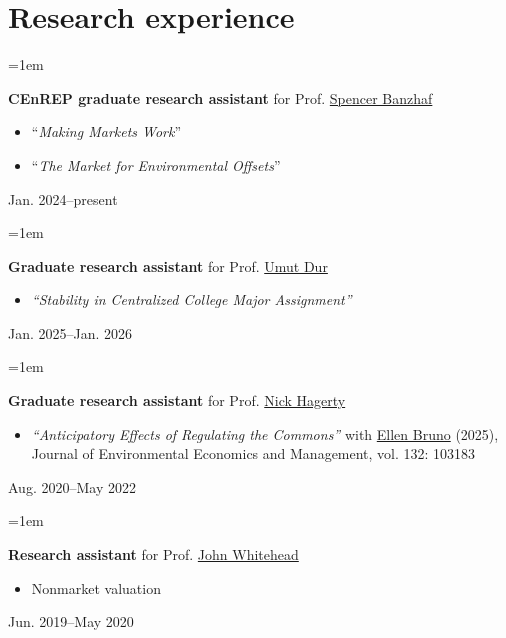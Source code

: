 \documentclass[12pt]{article}
\newenvironment{highlightsforbulletentries}{
	\begin{itemize}[
		topsep=0.10 cm,
		partopsep=0pt,
		leftmargin=20pt,
		]
	\setlength{\parsep}{0.10cm}\setlength{\itemsep}{-2pt}
	}{
	\end{itemize}
}
\newenvironment{twocolentry}[2][]{%
	\par\noindent\def\secondColumn{#2}%
	\begin{minipage}[t]{\linewidth-5.1cm}\raggedright\hangindent=1em\hangafter=1\relax%
	}
	{%
		\end{minipage}\hfill%
		\begin{minipage}[t]{5cm}\raggedleft\secondColumn\end{minipage}\par\smallskip
	}
\begin{document}
\section{Research experience}

\begin{twocolentry}
	{Jan. 2024--present}
	\textbf{CEnREP graduate research assistant} for Prof. \href{https://spencerbanzhaf.wordpress.ncsu.edu/}{Spencer Banzhaf}
	\begin{highlightsforbulletentries}
		\item ``\emph{Making Markets Work}''
		\item ``\emph{The Market for Environmental Offsets}''
	\end{highlightsforbulletentries}
\end{twocolentry}


\begin{twocolentry}
	{Jan. 2025--Jan. 2026}
	\textbf{Graduate research assistant} for Prof. \href{https://sites.google.com/site/umutdur/home}{Umut Dur}
	\begin{highlightsforbulletentries}
		\item \emph{``Stability in Centralized College Major Assignment''}
	\end{highlightsforbulletentries}
\end{twocolentry}

\begin{twocolentry}
	{Aug. 2020--May 2022}
	\textbf{Graduate research assistant} for Prof. \href{https://www.nickhagerty.com/}{Nick Hagerty}
	\begin{highlightsforbulletentries}
		\item \emph{``Anticipatory Effects of Regulating the Commons''} with \href{https://ellen-bruno.com/}{Ellen Bruno} (2025), Journal of Environmental Economics and Management, vol. 132: 103183
	\end{highlightsforbulletentries}
\end{twocolentry}

\begin{twocolentry}
	{Jun. 2019--May 2020}
	\textbf{Research assistant} for Prof. \href{https://economics.appstate.edu/directory/john-whitehead-phd}{John Whitehead}
	\begin{highlightsforbulletentries}
		\item Nonmarket valuation
	\end{highlightsforbulletentries}
\end{twocolentry}
\end{document}
